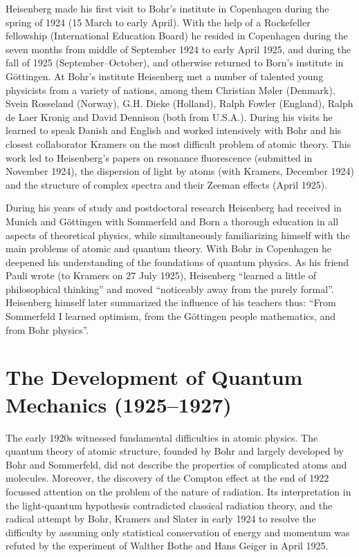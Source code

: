 \documentclass{article}
\begin{document}
Heisenberg made his first visit to Bohr's institute in Copenhagen during the spring of 1924 (15 March to early April). With the help of a Rockefeller fellowship (International Education Board) he resided in Copenhagen during the seven months from middle of September 1924 to early April 1925, and during the fall of 1925 (September--October), and otherwise returned to Born's institute in Göttingen. At Bohr's institute Heisenberg met a number of talented young physicists from a variety of nations, among them Christian Møler (Denmark), Svein Rosseland (Norway), G.H. Dieke (Holland), Ralph Fowler (England), Ralph de Laer Kronig and David Dennison (both from U.S.A.). During his visits he learned to speak Danish and English and worked intensively with Bohr and his closest collaborator Kramers on the most difficult problem of atomic theory. This work led to Heisenberg's papers on resonance fluorescence (submitted in November 1924), the dispersion of light by atoms (with Kramers, December 1924) and the structure of complex spectra and their Zeeman effects (April 1925).

During his years of study and postdoctoral research Heisenberg had received in Munich and Göttingen with Sommerfeld and Born a thorough education in all aspects of theoretical physics, while simultaneously familiarizing himself with the main problems of atomic and quantum theory. With Bohr in Copenhagen he deepened his understanding of the foundations of quantum physics. As his friend Pauli wrote (to Kramers on 27 July 1925), Heisenberg “learned a little of philosophical thinking” and moved “noticeably away from the purely formal”. Heisenberg himself later summarized the influence of his teachers thus: “From Sommerfeld I learned optimism, from the Göttingen people mathematics, and from Bohr physics”.

\section{The Development of Quantum Mechanics (1925--1927)}

The early 1920s witnessed fundamental difficulties in atomic physics. The quantum theory of atomic structure, founded by Bohr and largely developed by Bohr and Sommerfeld, did not describe the properties of complicated atoms and molecules. Moreover, the discovery of the Compton effect at the end of 1922 focussed attention on the problem of the nature of radiation. Its interpretation in the light-quantum hypothesis contradicted classical radiation theory, and the radical attempt by Bohr, Kramers and Slater in early 1924 to resolve the difficulty by assuming only statistical conservation of energy and momentum was refuted by the experiment of Walther Bothe and Hans Geiger in April 1925.
\end{document}
